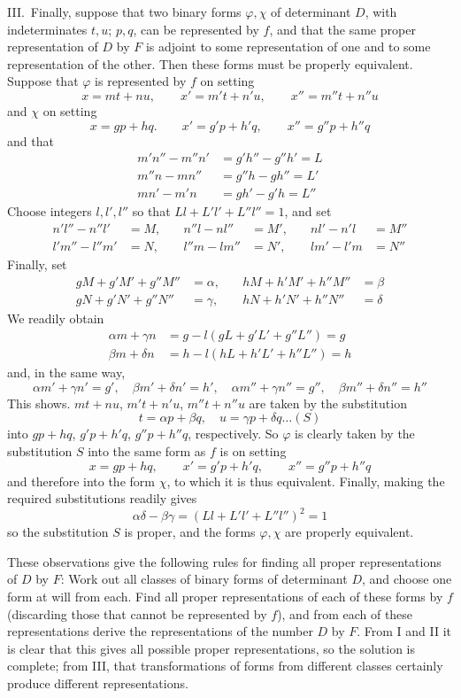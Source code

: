 III.\ Finally, suppose that two binary forms $\varphi,\chi$ of determinant $D$,
with indeterminates $t,u$; $p,q$, can be represented by $f$,
and that the same proper representation of $D$ by $F$ is adjoint
to some representation of one and to some representation of the other.
Then these forms must be properly equivalent. Suppose that $\varphi$ is
represented by $f$ on setting
\[
x=mt+nu,\qquad x'=m't+n'u,\qquad x''=m''t+n''u
\]
and $\chi$ on setting
\[
x=gp+hq.\qquad x'=g'p+h'q,\qquad x''=g''p+h''q
\]
and that
\[
\begin{aligned}
m'n''-m''n'&=g'h''-g''h'=L\\
m''n-mn''&=g''h-gh''=L'\\
mn'-m'n&=gh'-g'h=L''
\end{aligned}
\]
Choose integers $l,l',l''$ so that $Ll+L'l'+L''l''=1$, and set
\[
\begin{aligned}
n'l''-n''l'&=M,&\quad n''l-nl''&=M',&\quad nl'-n'l&=M''\\
l'm''-l''m'&=N,&\quad l''m-lm''&=N',&\quad lm'-l'm&=N''
\end{aligned}
\]
Finally, set
\[
\begin{aligned}
gM+g'M'+g''M''&=\alpha,&\quad hM+h'M'+h''M''&=\beta\\
gN+g'N'+g''N''&=\gamma,&\quad hN+h'N'+h''N''&=\delta
\end{aligned}
\]
We readily obtain
\[
\begin{aligned}
\alpha m+\gamma n&=g-l(gL+g'L'+g''L'')=g\\
\beta m+\delta n&=h-l(hL+h'L'+h''L'')=h
\end{aligned}
\]
and, in the same way,
\[
\alpha m'+\gamma n'=g',\quad \beta m'+\delta n'=h',\quad
\alpha m''+\gamma n''=g'',\quad \beta m''+\delta n''=h''
\]
This shows. $mt+nu$, $m't+n'u$, $m''t+n''u$ are taken by the substitution
\[
t=\alpha p+\beta q,\quad u=\gamma p+\delta q\ldots(S)
\]
into $gp+hq$, $g'p+h'q$, $g''p+h''q$, respectively. So $\varphi$ is clearly
taken by the substitution $S$ into the same form as $f$ is on setting
\[
x=gp+hq,\qquad x'=g'p+h'q,\qquad x''=g''p+h''q
\]
and therefore into the form $\chi$, to which it is thus equivalent.
Finally, making the required substitutions readily gives
\[
\alpha\delta-\beta\gamma=(Ll+L'l'+L''l'')^2=1
\]
so the substitution $S$ is proper, and the forms $\varphi,\chi$ are properly equivalent.

These observations give the following rules for finding all proper
representations of $D$ by $F$: Work out all classes of binary
forms of determinant $D$, and choose one form at will from each.
Find all proper representations of each of these forms by $f$
(discarding those that cannot be represented by $f$), and from each
of these representations derive the representations of the number $D$
by $F$. From I and II it is clear that this gives all possible proper
representations, so the solution is complete; from III, that transformations
of forms from different classes certainly produce different representations.

